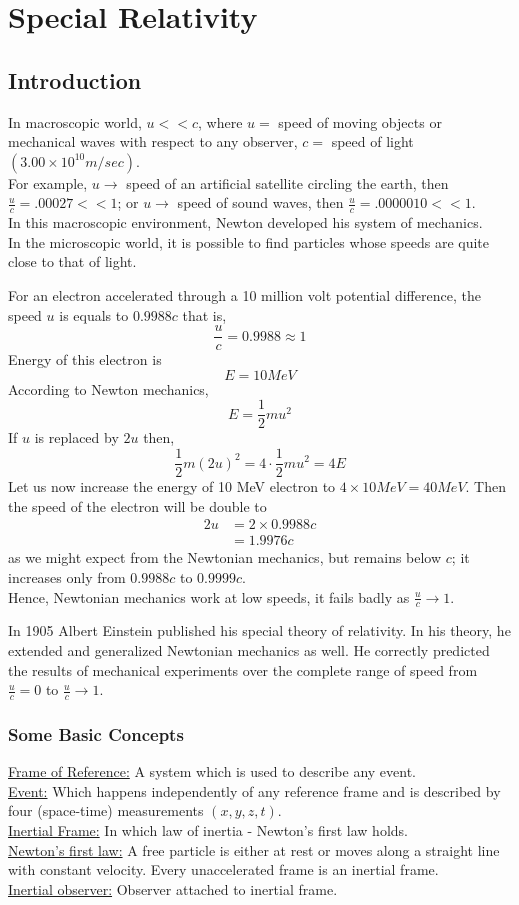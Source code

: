 \documentclass[../main-sheet.tex]{subfiles}
\begin{document}
\chapter{Special Relativity}
\section{Introduction}
In macroscopic world, \(u<<c \), where \(u= \) speed of moving objects or mechanical waves with respect to any observer, \(c= \) speed of light \((3.00\times10^{10} m/sec)\).\\
For example, \(u\to \) speed of an artificial satellite circling the earth, then \(\frac{u }{c }=.00027<<1\); or \(u\to \) speed of sound waves, then \(\frac{u }{c }=.0000010<<1 \).\\
In this macroscopic environment, Newton developed his system of mechanics.\\
In the microscopic world, it is possible to find particles whose speeds are quite close to that of light.
\begin{ex}
    For an electron accelerated through a 10 million volt potential difference, the speed \(u \) is equals to \(0.9988c \) that is,
    \[\frac{u }{c }=0.9988\approx 1 \]
    Energy of this electron is
    \[E=10MeV\]
    According to Newton mechanics, 
    \[E=\frac{1}{2}mu^2 \]
    If \(u \) is replaced by \(2u \) then,
    \[\frac{1}{2}m(2u)^2=4\cdot\frac{1}{2}mu^2=4E\]
    Let us now increase the energy of 10 MeV electron to \(4\times 10 MeV=40 MeV \). Then the speed of the electron will be double to
    \begin{align*}
        2u&=2\times 0.9988 c\\
        &=1.9976 c
    \end{align*}
    as we might expect from the Newtonian mechanics, but remains below \(c \); it increases only from \(0.9988 c \) to \(0.9999 c \).\\
    Hence, Newtonian mechanics work at low speeds, it fails badly as \(\frac{u}{c }\to 1\).
\end{ex}
In 1905 Albert Einstein published his special theory of relativity. In his theory, he extended and generalized Newtonian mechanics as well. He correctly predicted the results of mechanical experiments over the complete range of speed from \(\frac{u }{c }=0 \)  to \(\frac{u }{c }\to 1\).
\subsection{Some Basic Concepts }
\underline{Frame of Reference:} A system which is used to describe any event.\\
\underline{Event:} Which happens independently of any reference frame and is described by four (space-time) measurements \((x,y,z,t )\).\\
\underline{Inertial Frame:} In which law of inertia - Newton's first law holds.\\
\underline{Newton's first law:} A free particle is either at rest or moves along a straight line with constant velocity. Every unaccelerated frame is an inertial frame.\\
\underline{Inertial observer:} Observer attached to inertial frame.
\end{document}
